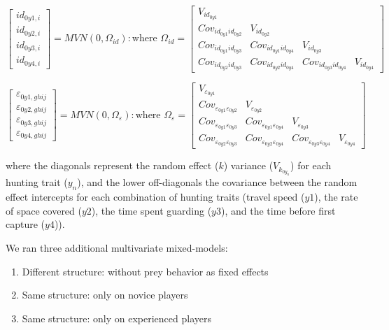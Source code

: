 \documentclass[
  11pt,
]{article}
\providecommand{\tightlist}{%
  \setlength{\itemsep}{0pt}\setlength{\parskip}{0pt}}
\begin{document}
\[
\begin{bmatrix}
id_{0y1,i} \\ 
id_{0y2,i} \\ 
id_{0y3,i} \\
id_{0y4,i}
\end{bmatrix}
= MVN(0, \Omega_{id}) : \text{where } \Omega_{id} = 
\begin{bmatrix}
V_{id_{0y1}} & & &  \\
Cov_{id_{0y1}id_{0y2}} & V_{id_{0y2}} & & \\
Cov_{id_{0y1}id_{0y3}} & Cov_{id_{0y1}id_{0y4}} & V_{id_{0y3}} & \\
Cov_{id_{0y2}id_{0y3}} & Cov_{id_{0y2}id_{0y4}} & Cov_{id_{0y3}id_{0y4}} & V_{id_{0y4}}
\end{bmatrix}
\tag{S3}
\]

\[
\begin{bmatrix}
\varepsilon_{0y1,ghij} \\ 
\varepsilon_{0y2,ghij} \\ 
\varepsilon_{0y3,ghij} \\
\varepsilon_{0y4,ghij}
\end{bmatrix}
= MVN(0, \Omega_{\varepsilon}) : \text{where } \Omega_{\varepsilon} = 
\begin{bmatrix}
V_{\varepsilon_{0y1}} & & & \\
Cov_{\varepsilon_{0y1}\varepsilon_{0y2}} & V_{\varepsilon_{0y2}} & & \\ 
Cov_{\varepsilon_{0y1}\varepsilon_{0y3}} & Cov_{\varepsilon_{0y1}\varepsilon_{0y4}} & V_{\varepsilon_{0y3}} & \\
Cov_{\varepsilon_{0y2}\varepsilon_{0y3}} & Cov_{\varepsilon_{0y2}\varepsilon_{0y4}} & Cov_{\varepsilon_{0y3}\varepsilon_{0y4}} & V_{\varepsilon_{0y4}}
\end{bmatrix}
\tag{S4}
\]

where the diagonals represent the random effect (\(k\)) variance
(\(V_{k_{0y_n}}\)) for each hunting trait (\(y_n\)), and the lower
off-diagonals the covariance between the random effect intercepts for
each combination of hunting traits (travel speed (\(y1\)), the rate of
space covered (\(y2\)), the time spent guarding (\(y3\)), and the time
before first capture (\(y4\))).

We ran three additional multivariate mixed-models:

\begin{enumerate}
\def\labelenumi{\arabic{enumi}.}
\tightlist
\item
  Different structure: without prey behavior as fixed effects
\item
  Same structure: only on novice players
\item
  Same structure: only on experienced players
\end{enumerate}
\end{document}
